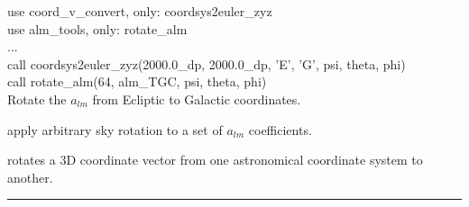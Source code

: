 \begin{example}
{
use coord\_v\_convert, only: coordsys2euler\_zyz \\
use alm\_tools, only: rotate\_alm \\
...\\
call coordsys2euler\_zyz(2000.0\_dp, 2000.0\_dp, 'E', 'G', psi, theta, phi) \\
call rotate\_alm(64, alm\_TGC, psi, theta, phi)  \\
}
{
Rotate the $a_{lm}$ from Ecliptic to Galactic coordinates.
}
\end{example}


\begin{related}
  \begin{sulist}{} %
  \item[\htmlref{rotate\_alm}{sub:rotate_alm}] apply arbitrary sky rotation to a
  set of $a_{lm}$ coefficients.
  \item[\htmlref{xcc\_v\_convert}{sub:xcc_v_convert}] rotates a 3D coordinate
vector from one astronomical coordinate system to another.
  \end{sulist}
\end{related}

\rule{\hsize}{2mm}

\newpage
